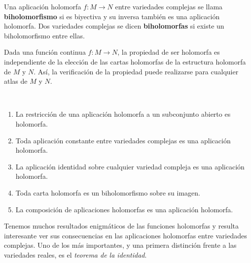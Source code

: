     \begin{definition}
        Una aplicación holomorfa $f:M\to N$ entre variedades complejas se llama \textbf{biholomorfismo} si es biyectiva y su inversa también es una aplicación holomorfa. Dos variedades complejas se dicen \textbf{biholomorfas} si existe un biholomorfismo entre ellas.
    \end{definition}

    \begin{remark}
        Dada una función continua $f:M\to N$, la propiedad de ser holomorfa es independiente de la elección de las cartas holomorfas de la estructura holomorfa de $M$ y $N$. Así, la verificación de la propiedad puede realizarse para cualquier atlas de $M$ y $N$.
    \end{remark}

    \begin{lemma}$ $
        \begin{enumerate}
            \item La restricción de una aplicación holomorfa a un subconjunto abierto es holomorfa.
            \item Toda aplicación constante entre variedades complejas es una aplicación holomorfa.
            \item La aplicación identidad sobre cualquier variedad compleja es una aplicación holomorfa.
            \item Toda carta holomorfa es un biholomorfismo sobre su imagen.
            \item La composición de aplicaciones holomorfas es una aplicación holomorfa.
        \end{enumerate}
    \end{lemma}

    Tenemos muchos resultados enigmáticos de las funciones holomorfas y resulta interesante ver sus consecuencias en las aplicaciones holomorfas entre variedades complejas. Uno de los más importantes, y una primera distinción frente a las variedades reales, es el \textit{teorema de la identidad}.

